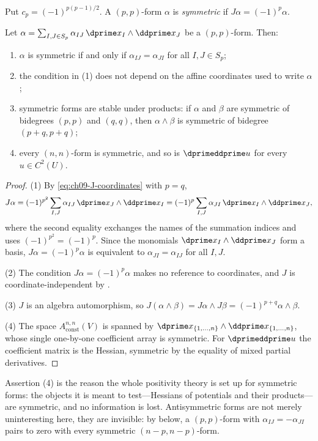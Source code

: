 Put $c_p=(-1)^{p(p-1)/2}$. A $(p,p)$-form $\alpha$ is
\emph{symmetric} if $J\alpha=(-1)^p\alpha$.

\begin{proposition}
\label{prop:ch09-symmetry-matrix}
Let $\alpha=\sum_{I,J\in S_p}\alpha_{IJ}\,\dprime x_I\wedge\ddprime x_J$ be a
$(p,p)$-form.  Then:
\begin{enumerate}
\item $\alpha$ is symmetric if and only if $\alpha_{IJ}=\alpha_{JI}$ for all
  $I,J\in S_p$;
\item the condition in \textup{(1)} does not depend on the affine coordinates
  used to write $\alpha$;
\item symmetric forms are stable under products: if $\alpha$ and $\beta$ are
  symmetric of bidegrees $(p,p)$ and $(q,q)$, then $\alpha\wedge\beta$ is
  symmetric of bidegree $(p+q,p+q)$;
\item every $(n,n)$-form is symmetric, and so is $\dprimeddprime u$ for every
  $u\in C^2(U)$.
\end{enumerate}
\end{proposition}

\begin{proof}
(1) By \eqref{eq:ch09-J-coordinates} with $p=q$,
\[
 J\alpha=(-1)^{p^2}\sum_{I,J}\alpha_{IJ}\,\dprime x_J\wedge\ddprime x_I
        =(-1)^{p}\sum_{I,J}\alpha_{JI}\,\dprime x_I\wedge\ddprime x_J,
\]
where the second equality exchanges the names of the summation indices and
uses $(-1)^{p^2}=(-1)^p$.  Since the monomials
$\dprime x_I\wedge\ddprime x_J$ form a basis, $J\alpha=(-1)^p\alpha$ is
equivalent to $\alpha_{JI}=\alpha_{IJ}$ for all $I,J$.

(2) The condition $J\alpha=(-1)^p\alpha$ makes no reference to coordinates,
and $J$ is coordinate-independent by
.

(3) $J$ is an algebra automorphism, so
$J(\alpha\wedge\beta)=J\alpha\wedge J\beta=(-1)^{p+q}\alpha\wedge\beta$.

(4) The space $A_{\mathrm{const}}^{n,n}(V)$ is spanned by
$\dprime x_{\{1,\ldots,n\}}\wedge\ddprime x_{\{1,\ldots,n\}}$, whose single
one-by-one coefficient array is symmetric.  For $\dprimeddprime u$ the
coefficient matrix is the Hessian, symmetric by the equality of mixed partial
derivatives.
\end{proof}

Assertion (4) is the reason the whole positivity theory is set up for
symmetric forms: the objects it is meant to test---Hessians of potentials and
their products---are symmetric, and no information is lost.  Antisymmetric
forms are not merely uninteresting here, they are invisible: by
 below, a $(p,p)$-form with
$\alpha_{IJ}=-\alpha_{JI}$ pairs to zero with every symmetric
$(n-p,n-p)$-form.

